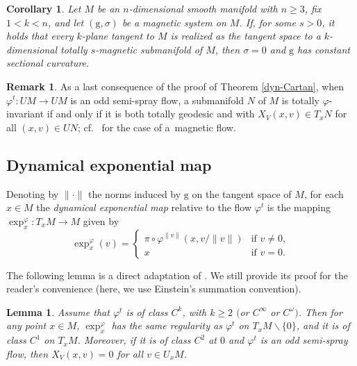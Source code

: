 \documentclass[10pt,a4paper]{amsart}
\newcommand{\g}{\mathrm{g}}
\numberwithin{equation}{section}
\newtheorem{Lemma}[Theorem]{Lemma}
\newtheorem{Corollary}[Theorem]{Corollary}
\theoremstyle{definition}
\newtheorem{rem}[Theorem]{Remark}
\begin{document}
\begin{Corollary}\label{cor:mag-cartan}
 Let $M$ be an $n$-dimensional smooth manifold with $n\geq 3$, fix $1<k<n$, and let $(\g,\sigma)$ be a magnetic system on $M$. If, for some $s>0$, it holds that every $k$-plane tangent to $M$ is realized as the tangent space to a $k$-dimensional totally $s$-magnetic submanifold of $M$, then $\sigma=0$ and $\g$ has constant sectional curvature.
\end{Corollary}

\begin{rem}
 As a last consequence of the proof of Theorem \ref{dyn-Cartan}, when $\varphi^t\colon UM\to UM$ is an odd semi-spray flow, a submanifold $N$ of $M$ is totally $\varphi$-invariant if and only if it is both totally geodesic and with $X_V(x,v)\in T_xN$ for all $(x,v)\in UN$; cf.\ \cite[Example 4.3]{terek2025submanifold} for the case of a~magnetic flow.
\end{rem}


\subsection{Dynamical exponential map}

Denoting by $\|\cdot\|$ the norms induced by $\g$ on the tangent space of $M$, for each $x\in M$ the \emph{dynamical ex\-po\-nen\-ti\-al map} relative to the flow $\varphi^t$ is the mapping $\exp_x^{\varphi} \colon T_xM \rightarrow M$ given by
\begin{equation}\label{def-psi-exp} \exp_x^{\varphi}(v) = \begin{cases} \pi \circ \varphi^{\|v\|}(x,v/\|v\|) &\text{if } v \neq 0, \\ x & \text{if } v = 0. \end{cases}\end{equation}

The following lemma is a direct adaptation of \cite[Lemma A.7]{dairbekov2007boundary}. We still provide its proof for the reader's convenience (here, we use Einstein's summation convention).

\begin{Lemma} \label{lem:dynamical-exp}
 Assume that $\varphi^t$ is of class $C^k$, with $k \geq 2$ $($or $C^\infty$ or $C^\omega)$. Then for any point $x\in M$, $\exp^\varphi_x$ has the same regularity as $\varphi^t$ on $T_xM\smallsetminus \{0\}$, and it is of class $C^1$ on $T_xM$. Moreover, if it is of class $C^2$ at $0$ and $\varphi^t$ is an odd semi-spray flow, then $X_V(x,v) = 0$ for all $v\in U_xM$.
\end{Lemma}
\end{document}
